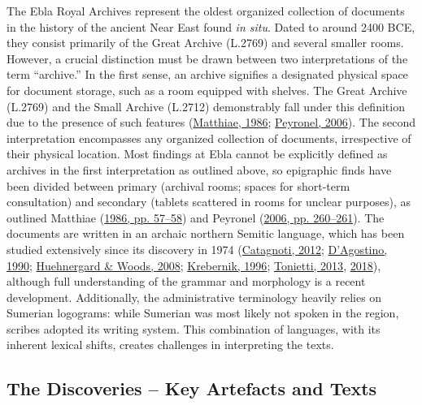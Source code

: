 \documentclass[
]{book}
\begin{document}
The Ebla Royal Archives represent the oldest organized collection of documents in the history of the ancient Near East found \emph{in situ}. Dated to around 2400 BCE, they consist primarily of the Great Archive (L.2769) and several smaller rooms. However, a crucial distinction must be drawn between two interpretations of the term ``archive.'' In the first sense, an archive signifies a designated physical space for document storage, such as a room equipped with shelves. The Great Archive (L.2769) and the Small Archive (L.2712) demonstrably fall under this definition due to the presence of such features (\protect\hyperlink{ref-Matthiae1986c}{Matthiae, 1986}; \protect\hyperlink{ref-Peyronel2006}{Peyronel, 2006}). The second interpretation encompasses any organized collection of documents, irrespective of their physical location. Most findings at Ebla cannot be explicitly defined as archives in the first interpretation as outlined above, so epigraphic finds have been divided between primary (archival rooms; spaces for short-term consultation) and secondary (tablets scattered in rooms for unclear purposes), as outlined Matthiae (\protect\hyperlink{ref-Matthiae1986c}{1986, pp. 57--58}) and Peyronel (\protect\hyperlink{ref-Peyronel2006}{2006, pp. 260--261}).
The documents are written in an archaic northern Semitic language, which has been studied extensively since its discovery in 1974 (\protect\hyperlink{ref-Catagnoti2012a}{Catagnoti, 2012}; \protect\hyperlink{ref-DAgostino1990a}{D'Agostino, 1990}; \protect\hyperlink{ref-HuehnergardWoods2008}{Huehnergard \& Woods, 2008}; \protect\hyperlink{ref-Krebernik1996b}{Krebernik, 1996}; \protect\hyperlink{ref-Tonietti2013a}{Tonietti, 2013}, \protect\hyperlink{ref-Tonietti2018b}{2018}), although full understanding of the grammar and morphology is a recent development. Additionally, the administrative terminology heavily relies on Sumerian logograms: while Sumerian was most likely not spoken in the region, scribes adopted its writing system. This combination of languages, with its inherent lexical shifts, creates challenges in interpreting the texts.

\hypertarget{the-discoveries-key-artefacts-and-texts}{%
\subsection{The Discoveries -- Key Artefacts and Texts}\label{the-discoveries-key-artefacts-and-texts}}
\end{document}
